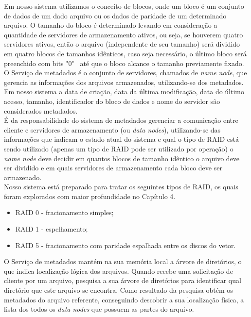 Em nosso sistema utilizamos o conceito de blocos, onde um bloco é um conjunto de dados de um dado arquivo ou os dados de paridade de um determinado arquivo. O tamanho do bloco é determinado levando em consideração a quantidade de servidores de armazenamento ativos, ou seja, se houverem quatro servidores ativos, então o arquivo (independente de seu tamanho) será dividido em quatro blocos de tamanhos idênticos, caso seja necessário, o último bloco será preenchido com bits "0" ~até que o bloco alcance o tamanho previamente fixado.
\\ 

O Serviço de metadados é o conjunto de servidores, chamados de \textit{name node}, que gerencia as informações dos arquivos armazenados, utilizando-se dos metadados. Em nosso sistema a data de criação, data da última modificação, data do último acesso, tamanho, identificador do bloco de dados e nome do servidor são considerados metadados. 
\\

É da responsabilidade do sistema de metadados gerenciar a comunicação entre cliente e servidores de armazenamento (ou  \textit{data nodes}), utilizando-se das informações que indicam o estado atual do sistema e qual o tipo de RAID está sendo utilizado (apenas um tipo de RAID pode ser utilizado por operação) o \textit{name node} deve decidir em quantos blocos de tamanho idêntico o arquivo deve ser dividido e em quais servidores de armazenamento cada bloco deve ser armazenado.
\\ 

Nosso sistema está preparado para tratar os seguintes tipos de RAID, os quais foram explorados com maior profundidade no Capítulo 4.
\\

\begin{itemize}
	\item RAID 0 - fracionamento simples;
	\item RAID 1 - espelhamento;
	\item RAID 5 - fracionamento com paridade espalhada entre os discos do vetor.
\end{itemize}

O Serviço de metadados mantém na sua memória local a árvore de diretórios, o que indica localização lógica dos arquivos. Quando recebe uma solicitação de cliente por um arquivo, pesquisa a sua árvore de diretórios para identificar qual diretório que este arquivo se encontra. Como resultado da pesquisa obtém os metadados do arquivo referente, conseguindo descobrir a sua localização física, a lista dos todos os \textit{data nodes} que possuem as partes do arquivo.
\\

